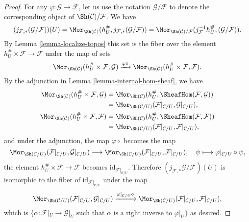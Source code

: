 \begin{proof}
For any $\varphi : \mathcal{G} \to \mathcal{F}$, let us use
the notation $\mathcal{G}/\mathcal{F}$ to denote the corresponding
object of $\Sh(\mathcal{C})/\mathcal{F}$. We have
$$
(j_{\mathcal{F}, *}(\mathcal{G}/\mathcal{F}))(U) =
\Mor_{\Sh(\mathcal{C})}(h_U^\#, j_{\mathcal{F}, *}(\mathcal{G}/\mathcal{F})) =
\Mor_{\Sh(\mathcal{C})/\mathcal{F}}(j_{\mathcal{F}}^{-1}h_U^{\#},
(\mathcal{G}/\mathcal{F})).
$$
By Lemma \ref{lemma-localize-topos} this set is the fiber over
the element $h_U^\# \times \mathcal{F} \to \mathcal{F}$ under the
map of sets
$$
\Mor_{\Sh(\mathcal{C})}(h_U^\# \times \mathcal{F}, \mathcal{G})
\xrightarrow{\varphi \circ}
\Mor_{\Sh(\mathcal{C})}(h_U^\# \times \mathcal{F}, \mathcal{F}).
$$
By the adjunction in Lemma \ref{lemma-internal-hom-sheaf}, we have
\begin{align*}
\Mor_{\Sh(\mathcal{C})}(h_U^{\#}\times\mathcal{F}, \mathcal{G})
& =
\Mor_{\Sh(\mathcal{C})}(h_U^{\#},\SheafHom(\mathcal{F}, \mathcal{G})) \\
& =
\Mor_{\Sh(\mathcal{C}/U)}(\mathcal{F}|_{\mathcal{C}/U},
\mathcal{G}|_{\mathcal{C}/U}), \\
\Mor_{\Sh(\mathcal{C})}(h_U^{\#} \times \mathcal{F}, \mathcal{F})
& =
\Mor_{\Sh(\mathcal{C})}(h_U^{\#},\SheafHom(\mathcal{F},\mathcal{F})) \\
& =
\Mor_{\Sh(\mathcal{C}/U)}(\mathcal{F}|_{\mathcal{C}/U},
\mathcal{F}|_{\mathcal{C}/U}),
\end{align*}
and under the adjunction, the map $\varphi\circ$ becomes the map
$$
\Mor_{\Sh(\mathcal{C}/U)}(\mathcal{F}|_{\mathcal{C}/U},
\mathcal{G}|_{\mathcal{C}/U})
\longrightarrow
\Mor_{\Sh(\mathcal{C}/U)}(\mathcal{F}|_{\mathcal{C}/U},
\mathcal{F}|_{\mathcal{C}/U}),\quad
\psi \longmapsto \varphi|_{\mathcal{C}/U} \circ \psi,
$$
the element $h_U^\# \times \mathcal{F} \to \mathcal{F}$
becomes $\text{id}_{\mathcal{F}|_{\mathcal{C}/U}}$.
Therefore $(j_{\mathcal{F}, *}\mathcal{G}/\mathcal{F})(U)$
is isomorphic to the fiber of
$\text{id}_{\mathcal{F}|_{\mathcal{C}/U}}$ under the map
$$
\Mor_{\Sh(\mathcal{C}/U)}(\mathcal{F}|_{\mathcal{C}/U},
\mathcal{G}|_{\mathcal{C}/U})
\xrightarrow{\varphi|_{\mathcal{C}/U}\circ}
\Mor_{\Sh(\mathcal{C}/U)}(\mathcal{F}|_{\mathcal{C}/U},
\mathcal{F}|_{\mathcal{C}/U}),
$$
which is $\{\alpha : \mathcal{F}|_U \to \mathcal{G}|_U
\text{ such that } \alpha \text{ is a right inverse to }\varphi|_U \}$
as desired.
\end{proof}


